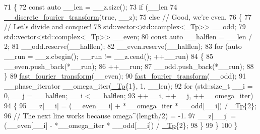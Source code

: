 \begin{DoxyCode}
71     \{
72       \textcolor{keyword}{const} \textcolor{keyword}{auto} \_\_len = \_\_z.size();
73       \textcolor{keywordflow}{if} (\_\_len %
74         \hyperlink{namespace____gnu__cxx_a6dff31b609fa2f8678c729d557dbae49}{\_\_discrete\_fourier\_transform}(\textcolor{keyword}{true}, \_\_z);
75       \textcolor{keywordflow}{else} \textcolor{comment}{// Good, we're even.}
76         \{
77           \textcolor{comment}{// Let's divide and conquer!}
78           std::vector<std::complex<\_Tp>> \_\_odd;
79           std::vector<std::complex<\_Tp>> \_\_even;
80           \textcolor{keyword}{const} \textcolor{keyword}{auto} \_\_halflen = \_\_len / 2;
81           \_\_odd.reserve(\_\_halflen);
82           \_\_even.reserve(\_\_halflen);
83           \textcolor{keywordflow}{for} (\textcolor{keyword}{auto} \_\_run = \_\_z.cbegin(); \_\_run != \_\_z.cend(); ++\_\_run)
84             \{
85               \_\_even.push\_back(*\_\_run);
86               ++\_\_run;
87               \_\_odd.push\_back(*\_\_run);
88             \}
89           \hyperlink{namespace____gnu__cxx_a64fbc0765e55d7466a21baa9f652362e}{fast\_fourier\_transform}(\_\_even);
90           \hyperlink{namespace____gnu__cxx_a64fbc0765e55d7466a21baa9f652362e}{fast\_fourier\_transform}(\_\_odd);
91           \_\_phase\_iterator \_\_omega\_iter(\hyperlink{namespace____gnu__cxx_a3b19a9c800ca194374ef9172290f7d79}{\_Tp}\{1\}, 1, \_\_len);
92           \textcolor{keywordflow}{for} (std::size\_t \_\_i = 0, \_\_j = \_\_halflen; \_\_i < \_\_halflen;
93                 ++\_\_i, ++\_\_j, ++\_\_omega\_iter)
94             \{
95               \_\_z[\_\_i] = (\_\_even[\_\_i] + *\_\_omega\_iter * \_\_odd[\_\_i]) / \hyperlink{namespace____gnu__cxx_a3b19a9c800ca194374ef9172290f7d79}{\_Tp}\{2\};
96               \textcolor{comment}{// The next line works because omega^(length/2) = -1.}
97               \_\_z[\_\_j] = (\_\_even[\_\_i] - *\_\_omega\_iter * \_\_odd[\_\_i]) / \hyperlink{namespace____gnu__cxx_a3b19a9c800ca194374ef9172290f7d79}{\_Tp}\{2\};
98             \}
99         \}
100     \}
\end{DoxyCode}
\mbox{\label{namespace____gnu__cxx_ae6b377214391002ca75ca712823fd45c}} 
